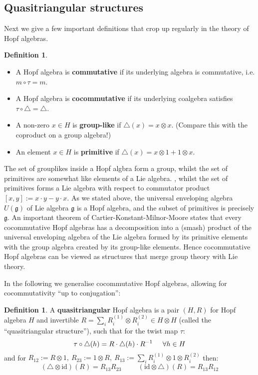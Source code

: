 \documentclass[11pt]{article}
\newcommand{\bb}{\medbreak}
\newcommand{\nt}{\noindent}
\newcommand{\cd}{\cdot}
\newcommand{\id}{\text{id}}
\newcommand{\define}[1]{\textbf{#1}}
\theoremstyle{definition}
\newtheorem{definition}[lemma]{Definition}
\begin{document}
\subsection{Quasitriangular structures}
\nt Next we give a few important definitions that crop up regularly in the theory of Hopf algebras.
\begin{definition}\begin{itemize}
  \item A Hopf algebra is \define{commutative} if its underlying algebra is commutative, i.e. $m\circ \tau=m$.
  \item A Hopf algebra is \define{cocommutative} if its underlying coalgebra satisfies $\tau \circ \triangle=\triangle$.
  \item A non-zero $x\in H$ is \define{group-like} if $\triangle(x)=x\otimes x$. (Compare this with the coproduct on a group algebra!)
  \item An element $x\in H$ is \define{primitive} if $\triangle(x)=x\otimes 1+1\otimes x$.
\end{itemize}
\end{definition}

\nt The set of grouplikes inside a Hopf algbra form a group, whilst the set of primitives are somewhat like elements of a Lie algebra. , whilst the set of primitives forms a Lie algebra with respect to commutator product $[x,y]:=x\cd y-y\cd x$. As we stated above, the universal enveloping algebra $U(\mathfrak{g})$ of Lie algebra $\mathfrak{g}$ is a Hopf algebra, and the subset of primitives is precisely $\mathfrak{g}$. An important theorem of Cartier-Konstant-Milnor-Moore states that every cocommutative Hopf algebras has a decomposition into a (smash) product of the universal enveloping algebra of the Lie algebra formed by its primitive elements with the group algebra created by its group-like elements. Hence cocommutative Hopf algebras can be viewed as structures that merge group theory with Lie theory.\bb

\nt In the following we generalise cocommutative Hopf algebras, allowing for cocommutativity ``up to conjugation'':
\begin{definition}A \define{quasitriangular} Hopf algebra is a pair $(H, R)$ for Hopf algebra $H$ and invertible $R=\sum_i R_i^{(1)}\otimes R_i^{(2)}\in H\otimes H$ (called the ``quasitriangular structure''), such that for the twist map $\tau$: 
$$\tau\circ \triangle(h)=R\cd \triangle(h)\cd R^{-1}\hspace{.5cm} \forall h\in H$$
and for $R_{12}:=R\otimes 1,\ R_{23}:=1\otimes R,\ R_{13}:=\sum_i R_i^{(1)}\otimes 1\otimes R_i^{(2)}$ then: 
$$(\triangle\otimes \id)(R)=R_{13}R_{23}\hspace{1cm} (\id\otimes \triangle)(R)=R_{13}R_{12}$$
\end{definition}
\end{document}
